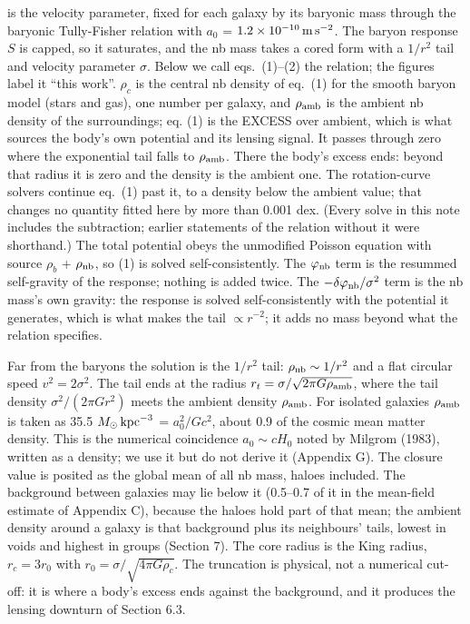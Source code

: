 \documentclass[
  10pt,
]{article}
\begin{document}
is the velocity parameter, fixed for each galaxy by its baryonic mass through the baryonic Tully-Fisher relation with $a_0$ = $1.2\times10^{-10}\,{\rm m\,s^{-2}}$. The baryon response $S$ is capped, so it saturates, and the nb mass takes a cored form with a $1/r^2$ tail and velocity parameter $\sigma$. Below we call eqs.~(1)--(2) the relation; the figures label it ``this work''. $\rho_c$ is the central nb density of eq.~(1) for the smooth baryon model (stars and gas), one number per galaxy, and $\rho_{\rm amb}$ is the ambient nb density of the surroundings; eq. (1) is the EXCESS over ambient, which is what sources the body's own potential and its lensing signal. It passes through zero where the exponential tail falls to $\rho_{\rm amb}$. There the body's excess ends: beyond that radius it is zero and the density is the ambient one. The rotation-curve solvers continue eq.~(1) past it, to a density below the ambient value; that changes no quantity fitted here by more than 0.001 dex. (Every solve in this note includes the subtraction; earlier statements of the relation without it were shorthand.) The total potential obeys the unmodified Poisson equation with source $\rho_b$ + $\rho_{\rm nb}$, so (1) is solved self-consistently. The $\varphi_{\rm nb}$ term is the resummed self-gravity of the response; nothing is added twice. The $-\delta\varphi_{\rm nb}/\sigma^2$ term is the nb mass's own gravity: the response is solved self-consistently with the potential it generates, which is what makes the tail $\propto r^{-2}$; it adds no mass beyond what the relation specifies.

Far from the baryons the solution is the $1/r^2$ tail: $\rho_{\rm nb}\sim 1/r^2$ and a flat circular speed $v^2=2\sigma^2$. The tail ends at the radius $r_t=\sigma/\sqrt{2\pi G\rho_{\rm amb}}$, where the tail density $\sigma^2/(2\pi G r^2)$ meets the ambient density $\rho_{\rm amb}$. For isolated galaxies $\rho_{\rm amb}$ is taken as 35.5 $M_\odot\,{\rm kpc}^{-3}$ = $a_0^2/Gc^2$, about 0.9 of the cosmic mean matter density. This is the numerical coincidence $a_0\sim cH_0$ noted by Milgrom (1983), written as a density; we use it but do not derive it (Appendix G). The closure value is posited as the global mean of all nb mass, haloes included. The background between galaxies may lie below it (0.5--0.7 of it in the mean-field estimate of Appendix C), because the haloes hold part of that mean; the ambient density around a galaxy is that background plus its neighbours' tails, lowest in voids and highest in groups (Section 7). The core radius is the King radius, $r_c=3r_0$ with $r_0=\sigma/\sqrt{4\pi G\rho_c}$. The truncation is physical, not a numerical cut-off: it is where a body's excess ends against the background, and it produces the lensing downturn of Section 6.3.
\end{document}
